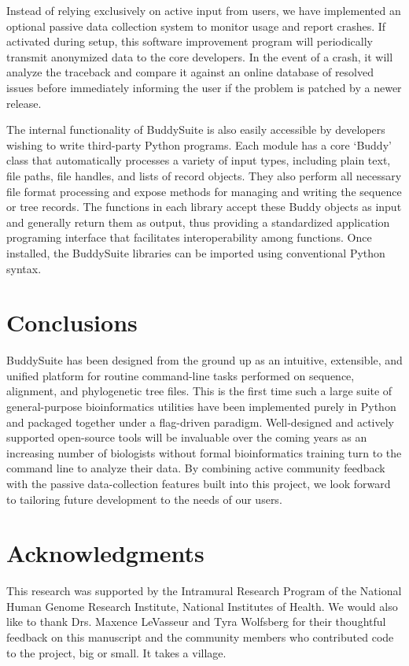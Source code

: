 \documentclass[nogrid]{MBE_article}%
\begin{document}
Instead of relying exclusively on active input from users, we have implemented an optional passive data collection system to monitor usage and report crashes. If activated during setup, this software improvement program will periodically transmit anonymized data to the core developers. In the event of a crash, it will analyze the traceback and compare it against an online database of resolved issues before immediately informing the user if the problem is patched by a newer release.

The internal functionality of BuddySuite is also easily accessible by developers wishing to write third-party Python programs. Each module has a core `Buddy' class that automatically processes a variety of input types, including plain text, file paths, file handles, and lists of record objects. They also perform all necessary file format processing and expose methods for managing and writing the sequence or tree records. The functions in each library accept these Buddy objects as input and generally return them as output, thus providing a standardized application programing interface that facilitates interoperability among functions. Once installed, the BuddySuite libraries can be imported using conventional Python syntax.

\section{Conclusions}
BuddySuite has been designed from the ground up as an intuitive, extensible, and unified platform for routine command-line tasks performed on sequence, alignment, and phylogenetic tree files. This is the first time such a large suite of general-purpose bioinformatics utilities have been implemented purely in Python and packaged together under a flag-driven paradigm. Well-designed and actively supported open-source tools will be invaluable over the coming years as an increasing number of biologists without formal bioinformatics training turn to the command line to analyze their data. By combining active community feedback with the passive data-collection features built into this project, we look forward to tailoring future development to the needs of our users.


\section{Acknowledgments}
This research was supported by the Intramural Research Program of the National Human Genome Research Institute, National Institutes of Health. We would also like to thank Drs. Maxence LeVasseur and Tyra Wolfsberg for their thoughtful feedback on this manuscript and the community members who contributed code to the project, big or small. It takes a village.
\end{document}
